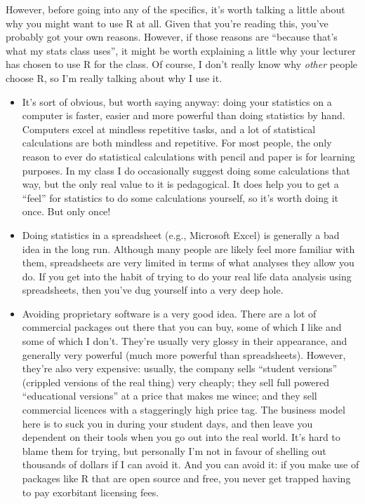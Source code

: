 \documentclass[
]{book}
\providecommand{\tightlist}{%
  \setlength{\itemsep}{0pt}\setlength{\parskip}{0pt}}
\begin{document}
However, before going into any of the specifics, it's worth talking a little about why you might want to use R at all. Given that you're reading this, you've probably got your own reasons. However, if those reasons are ``because that's what my stats class uses'', it might be worth explaining a little why your lecturer has chosen to use R for the class. Of course, I don't really know why \emph{other} people choose R, so I'm really talking about why I use it.

\begin{itemize}
\tightlist
\item
  It's sort of obvious, but worth saying anyway: doing your statistics on a computer is faster, easier and more powerful than doing statistics by hand. Computers excel at mindless repetitive tasks, and a lot of statistical calculations are both mindless and repetitive. For most people, the only reason to ever do statistical calculations with pencil and paper is for learning purposes. In my class I do occasionally suggest doing some calculations that way, but the only real value to it is pedagogical. It does help you to get a ``feel'' for statistics to do some calculations yourself, so it's worth doing it once. But only once!
\item
  Doing statistics in a spreadsheet (e.g., Microsoft Excel) is generally a bad idea in the long run. Although many people are likely feel more familiar with them, spreadsheets are very limited in terms of what analyses they allow you do. If you get into the habit of trying to do your real life data analysis using spreadsheets, then you've dug yourself into a very deep hole.
\item
  Avoiding proprietary software is a very good idea. There are a lot of commercial packages out there that you can buy, some of which I like and some of which I don't. They're usually very glossy in their appearance, and generally very powerful (much more powerful than spreadsheets). However, they're also very expensive: usually, the company sells ``student versions'' (crippled versions of the real thing) very cheaply; they sell full powered ``educational versions'' at a price that makes me wince; and they sell commercial licences with a staggeringly high price tag. The business model here is to suck you in during your student days, and then leave you dependent on their tools when you go out into the real world. It's hard to blame them for trying, but personally I'm not in favour of shelling out thousands of dollars if I can avoid it. And you can avoid it: if you make use of packages like R that are open source and free, you never get trapped having to pay exorbitant licensing fees.

\end{itemize}
\end{document}
